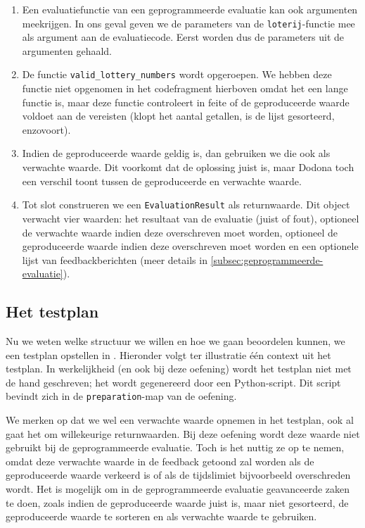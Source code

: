 \begin{enumerate}
    \item Een evaluatiefunctie van een geprogrammeerde evaluatie kan ook argumenten meekrijgen.
    In ons geval geven we de parameters van de \texttt{loterij}-functie mee als argument aan de evaluatiecode.
    Eerst worden dus de parameters uit de argumenten gehaald.
    \item De functie \texttt{valid\_lottery\_numbers} wordt opgeroepen.
    We hebben deze functie niet opgenomen in het codefragment hierboven omdat het een lange functie is, maar deze functie controleert in feite of de geproduceerde waarde voldoet aan de vereisten (klopt het aantal getallen, is de lijst gesorteerd, enzovoort).
    \item Indien de geproduceerde waarde geldig is, dan gebruiken we die ook als verwachte waarde.
    Dit voorkomt dat de oplossing juist is, maar Dodona toch een verschil toont tussen de geproduceerde en verwachte waarde.
    \item Tot slot construeren we een \texttt{EvaluationResult} als returnwaarde.
    Dit object verwacht vier waarden: het resultaat van de evaluatie (juist of fout), optioneel de verwachte waarde indien deze overschreven moet worden, optioneel de geproduceerde waarde indien deze overschreven moet worden en een optionele lijst van feedbackberichten (meer details in \cref{subsec:geprogrammeerde-evaluatie}).
\end{enumerate}

\subsection{Het testplan}\label{subsec:oefening-lotto-testplan}

Nu we weten welke structuur we willen en hoe we gaan beoordelen kunnen, we een testplan opstellen in .
Hieronder volgt ter illustratie één context uit het testplan.
In werkelijkheid (en ook bij deze oefening) wordt het testplan niet met de hand geschreven;
het wordt gegenereerd door een Python-script.
Dit script bevindt zich in de \texttt{preparation}-map van de oefening.

We merken op dat we wel een verwachte waarde opnemen in het testplan, ook al gaat het om willekeurige returnwaarden.
Bij deze oefening wordt deze waarde niet gebruikt bij de geprogrammeerde evaluatie.
Toch is het nuttig ze op te nemen, omdat deze verwachte waarde in de feedback getoond zal worden als de geproduceerde waarde verkeerd is of als de tijdslimiet bijvoorbeeld overschreden wordt.
Het is mogelijk om in de geprogrammeerde evaluatie geavanceerde zaken te doen, zoals indien de geproduceerde waarde juist is, maar niet gesorteerd, de geproduceerde waarde te sorteren en als verwachte waarde te gebruiken.

